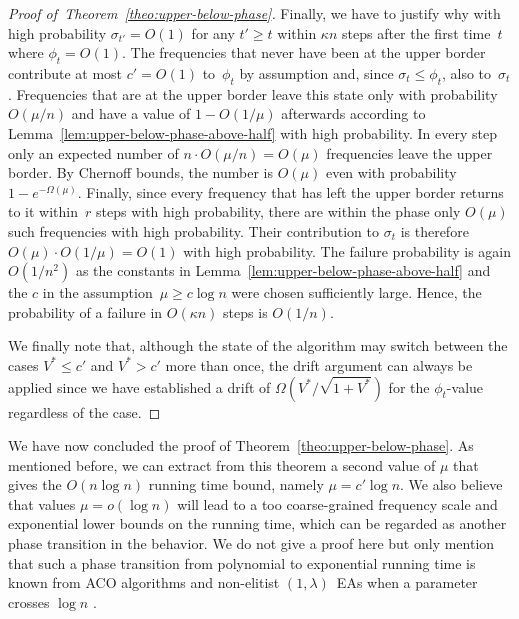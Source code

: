 \documentclass[11pt, a4paper]{article}
\newenvironment{proofof}[1]{\begin{proof}[Proof of~#1]}{\end{proof}}
\begin{document}
\begin{proofof}{Theorem~\ref{theo:upper-below-phase}}
Finally, we have to justify why with high probability 
$\sigma_{t'}=O(1)$ for any $t'\ge t$ within $\kappa n$ steps 
after the first time~$t$ where $\phi_t=O(1)$. The frequencies 
that never have been at the upper border 
contribute at most $c'=O(1)$ to~$\phi_t$ 
by assumption and, since $\sigma_t\le \phi_t$, also to~$\sigma_t$. 
Frequencies that are  at the upper border leave this state only with probability $O(\mu/n)$ 
and have a value of $1-O(1/\mu)$ afterwards according to Lemma~\ref{lem:upper-below-phase-above-half} with 
high probability. In every step only an expected number of 
$n\cdot O(\mu/n)=O(\mu)$ frequencies leave the upper border. By Chernoff bounds, the number is $O(\mu)$ 
even with probability $1-e^{-\Omega(\mu)}$. 
Finally, 
since every frequency that has left the upper border returns to it within~$r$ steps with high 
probability, there are within the phase only 
$O(\mu)$ such frequencies with high probability. 
%
Their contribution to $\sigma_t$ is therefore $O(\mu)\cdot O(1/\mu)=O(1)$ with high probability. The 
failure probability is again $O(1/n^2)$ as the constants in Lemma~\ref{lem:upper-below-phase-above-half}
and the $c$ in the assumption~$\mu\ge c\log n$ were chosen sufficiently large. 
Hence, the probability of a failure in $O(\kappa n)$ steps 
is $O(1/n)$.   

We finally note that, although the state of the algorithm may switch between the cases $V^*\le c'$ and $V^*>c'$
more than once, the drift argument can always be applied since we have established a drift of 
$ \Omega(V^*/\sqrt{1+V^*})$ for the $\phi_t$-value regardless of the case.
\end{proofof}



We have now concluded the proof of Theorem~\ref{theo:upper-below-phase}. 
As mentioned before, we can extract from this theorem 
 a second value of $\mu$ that gives the 
$O(n\log n)$ running time bound, namely $\mu=c'\log n$. We also believe that 
values $\mu=o(\log n)$ will lead to a too coarse-grained frequency scale 
and exponential lower bounds on the running time, which can be regarded 
as another phase transition in the behavior. We do not give a proof here 
but only mention that such a phase transition from polynomial to exponential 
running time is known from ACO algorithms and non-elitist $(1,\lambda)$~EAs when 
a parameter crosses $\log n$ \cite{Neumann2010a,RoweSudholtTCS2014}.
\end{document}
